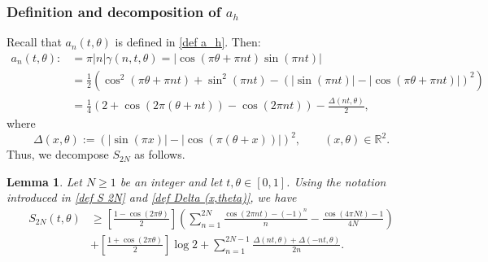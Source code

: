 \documentclass[12pt]{amsart}
\newtheorem{lem}[thm]{Lemma}
\theoremstyle{definition}
\numberwithin{equation}{section}
\numberwithin{equation}{section}
\def\R{\mathbb{R}}
\begin{document}
\subsubsection{Definition and decomposition of $a_h$}
Recall that $a_n(t,\theta)$ is defined in \eqref{def a_h}. Then:
\begin{align*}
   a_{n}(t, \theta) :&= \pi|n|\gamma(n,t,\theta) = |\cos(\pi \theta+\pi nt)\sin(\pi n t)|\\
    &=\frac{1}{2}\left(\cos^2(\pi \theta+\pi n t)+\sin^2(\pi n t)-\left(|\sin(\pi n t)|-|\cos(\pi \theta+\pi n t)|
    \right)^2\right)\\
    &= \frac{1}{4}\left(2+\cos(2\pi (\theta+ n t))-\cos(2\pi n t)\right)-\frac{\Delta( n t,\theta)}{2},
\end{align*}
where
\begin{equation}\label{def Delta (x,theta)}
\Delta(x,\theta):= (|\sin(\pi x)|-|\cos(\pi (\theta+x))|)^2,
\qquad (x,\theta)\in\R^2.    
\end{equation}
Thus, we decompose $S_{2N}$ as follows.
\begin{lem}\label{lem S_2k decomposition}Let \(N\geq1\) be an integer and let \(t,\theta\in[0,1]\). Using the notation introduced in \eqref{def S 2N} and \eqref{def Delta (x,theta)}, we have
    \begin{align*}
    S_{2N}(t,\theta)&\geq  
    \left[\frac{1-\cos(2\pi \theta)}{2}\right]\left(\sum_{n=1}^{2N} \frac{\cos(2\pi nt)-(-1)^n}{n} - \frac{\cos(4\pi N t)-1}{4N}\right)\\
    &+\left[\frac{1+\cos(2\pi \theta)}{2}\right]\log 2+\sum_{n=1}^{2N-1}
    \frac{\Delta(nt,\theta) +\Delta(-nt,\theta)}{2n}.
\end{align*}
\end{lem}
\end{document}
